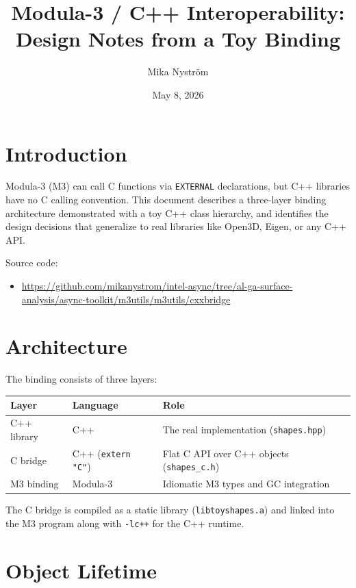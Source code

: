 \documentclass[11pt]{article}
\title{Modula-3 / C++ Interoperability:\\Design Notes from a Toy Binding}
\author{Mika Nystr\"om}
\date{May 8, 2026}
\begin{document}
\maketitle
\tableofcontents
\clearpage

\section{Introduction}

Modula-3 (M3) can call C functions via \texttt{EXTERNAL} declarations,
but C++ libraries have no C calling convention.  This document describes
a three-layer binding architecture demonstrated with a toy C++ class
hierarchy, and identifies the design decisions that generalize to
real libraries like Open3D, Eigen, or any C++ API.

Source code:
\begin{itemize}
\item \url{https://github.com/mikanystrom/intel-async/tree/al-ga-surface-analysis/async-toolkit/m3utils/m3utils/cxxbridge}
\end{itemize}

\section{Architecture}

The binding consists of three layers:

\begin{center}
\begin{tabular}{lll}
\textbf{Layer} & \textbf{Language} & \textbf{Role} \\
\hline
C++ library  & C++  & The real implementation (\texttt{shapes.hpp}) \\
C bridge     & C++ (\texttt{extern "C"}) & Flat C API over C++ objects (\texttt{shapes\_c.h}) \\
M3 binding   & Modula-3 & Idiomatic M3 types and GC integration \\
\end{tabular}
\end{center}

The C bridge is compiled as a static library (\texttt{libtoyshapes.a})
and linked into the M3 program along with \texttt{-lc++} for the C++
runtime.

\section{Object Lifetime}
\end{document}
